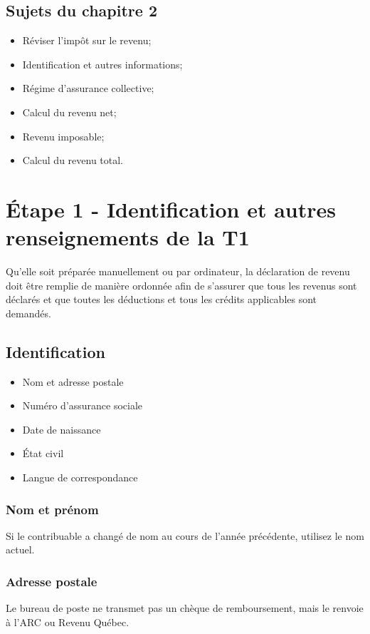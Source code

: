 \subsection{Sujets du chapitre 2}
\begin{itemize}
	\item Réviser l'impôt sur le revenu;
	\item Identification et autres informations;
	\item Régime d'assurance collective;
	\item Calcul du revenu net;
	\item Revenu imposable;
	\item Calcul du revenu total.
\end{itemize}



\section{Étape 1 - \og Identification et autres renseignements\fg{} de la T1}
\begin{intro}
	Qu'elle soit préparée manuellement ou par ordinateur, la déclaration de revenu doit être remplie de manière ordonnée afin de s'assurer que tous les revenus sont déclarés et que toutes les déductions et tous les crédits applicables sont demandés.
\end{intro}


\subsection{Identification}
\begin{itemize}
	\item Nom et adresse postale
	\item Numéro d'assurance sociale
	\item Date de naissance
	\item État civil
	\item Langue de correspondance
\end{itemize}

\subsubsection{Nom et prénom}
Si le contribuable a changé de nom au cours de l'année précédente, utilisez le nom actuel.

\subsubsection{Adresse postale}
Le bureau de poste ne transmet pas un chèque de remboursement, mais le renvoie à l'ARC ou Revenu Québec.

